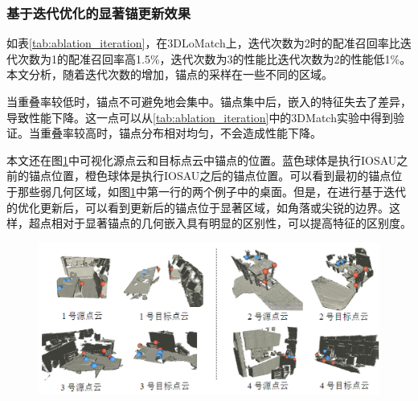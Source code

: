     \subsubsection{基于迭代优化的显著锚更新效果}
    如表\ref{tab:ablation_iteration}，在3DLoMatch上，迭代次数为2时的配准召回率比迭代次数为1的配准召回率高1.5\%，迭代次数为3的性能比迭代次数为2的性能低1\%。本文分析，随着迭代次数的增加，锚点的采样在一些不同的区域。

    当重叠率较低时，锚点不可避免地会集中。锚点集中后，嵌入的特征失去了差异，导致性能下降。这一点可以从\ref{tab:ablation_iteration}中的3DMatch实验中得到验证。当重叠率较高时，锚点分布相对均匀，不会造成性能下降。

    

    本文还在图\ref{fig:ablation_iteration}中可视化源点云和目标点云中锚点的位置。蓝色球体是执行IOSAU之前的锚点位置，橙色球体是执行IOSAU之后的锚点位置。可以看到最初的锚点位于那些弱几何区域，如图\ref{fig:ablation_iteration}中第一行的两个例子中的桌面。但是，在进行基于迭代的优化更新后，可以看到更新后的锚点位于显著区域，如角落或尖锐的边界。这样，超点相对于显著锚点的几何嵌入具有明显的区别性，可以提高特征的区别度。

    \vspace{-0.1cm}
    \begin{figure}[h]
        \centering
        \includegraphics[width = \textwidth]{my/figure/3-8.pdf}

        \label{fig:ablation_iteration}
    \end{figure}
    \vspace{-0.35cm}

